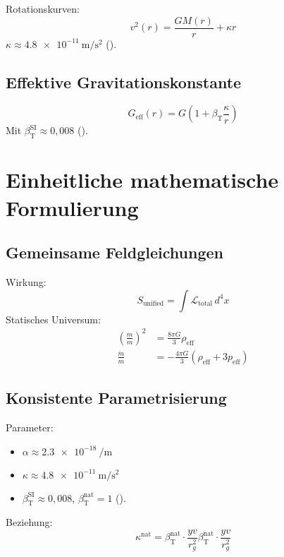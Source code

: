 \documentclass[a4paper,12pt]{article}
\theoremstyle{definition}
\theoremstyle{remark}
\newcommand{\betaT}{\beta_{\text{T}}}
\begin{document}
	Rotationskurven:
	\begin{equation}
		v^2(r) = \frac{G M(r)}{r} + \kappa r
	\end{equation}
	\(\kappa \approx \SI{4.8e-11}{\meter\per\second\squared}\) (\cite{pascher_galaxies_2025}).
	
	\subsection{Effektive Gravitationskonstante}
	
	\begin{equation}
		G_{\text{eff}}(r) = G \left(1 + \betaT \frac{\kappa}{r}\right)
	\end{equation}
	Mit \(\betaT^{\text{SI}} \approx 0,008\) (\cite{pascher_params_2025}).
	
	\section{Einheitliche mathematische Formulierung}
	
	\subsection{Gemeinsame Feldgleichungen}
	
	Wirkung:
	\begin{equation}
		S_\text{unified} = \int \mathcal{L}_\text{total} \, d^4x
	\end{equation}
	Statisches Universum:
	\begin{align}
		\left(\frac{\dot{m}}{m}\right)^2 &= \frac{8\pi G}{3} \rho_{\text{eff}} \\
		\frac{\ddot{m}}{m} &= -\frac{4\pi G}{3} (\rho_{\text{eff}} + 3p_{\text{eff}})
	\end{align}
	
	\subsection{Konsistente Parametrisierung}
	
	Parameter:
	\begin{itemize}
		\item \(\alpha \approx \SI{2.3e-18}{\per\meter}\)
		\item \(\kappa \approx \SI{4.8e-11}{\meter\per\second\squared}\)
		\item \(\betaT^{\text{SI}} \approx 0,008\), \(\betaT^{\text{nat}} = 1\) (\cite{pascher_params_2025}).
	\end{itemize}
	Beziehung:
	\begin{equation}
		\kappa^{\text{nat}} = \betaT^{\text{nat}} \cdot \frac{yv}{r_g^2}\betaT^{\text{nat}} \cdot \frac{yv}{r_g^2}
	\end{equation}
	
\end{document}
